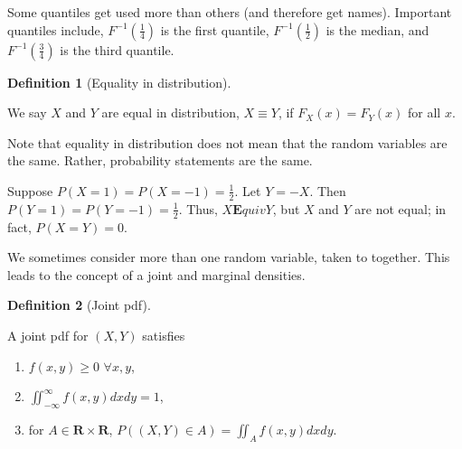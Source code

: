 \documentclass[
  a4paper,
  oneside]{book}
\providecommand{\tightlist}{%
  \setlength{\itemsep}{0pt}\setlength{\parskip}{0pt}}\usepackage{longtable,booktabs,array}
\theoremstyle{definition}
\newtheorem{definition}{Definition}[chapter]
\theoremstyle{definition}
\theoremstyle{definition}
\theoremstyle{plain}
\theoremstyle{remark}
\begin{document}
Some quantiles get used more than others (and therefore get names).
Important quantiles include, \(F^{-1}(\frac{1}{4})\) is the first
quantile, \(F^{-1}(\frac{1}{2})\) is the median, and
\(F^{-1}(\frac{3}{4})\) is the third quantile.

\begin{definition}[Equality in
distribution]\protect\hypertarget{def-equal-dist}{}\label{def-equal-dist}

We say \(X\) and \(Y\) are equal in distribution, \(X \equiv Y\), if
\(F_X(x) = F_Y(x)\) for all \(x\).

\end{definition}

\begin{tcolorbox}[enhanced jigsaw, colframe=quarto-callout-important-color-frame, breakable, toprule=.15mm, bottomrule=.15mm, title=\textcolor{quarto-callout-important-color}{\faExclamation}\hspace{0.5em}{Important}, arc=.35mm, opacityback=0, left=2mm, opacitybacktitle=0.6, bottomtitle=1mm, toptitle=1mm, titlerule=0mm, rightrule=.15mm, colback=white, colbacktitle=quarto-callout-important-color!10!white, coltitle=black, leftrule=.75mm]

Note that equality in distribution does not mean that the random
variables are the same. Rather, probability statements are the same.

Suppose \(P(X = 1) = P(X = -1) = \frac{1}{2}\). Let \(Y = -X\). Then
\(P(Y = 1) = P(Y = -1) = \frac{1}{2}\). Thus, \(X \mathbf{E}quiv Y\),
but \(X\) and \(Y\) are not equal; in fact, \(P(X = Y) = 0\).

\end{tcolorbox}

We sometimes consider more than one random variable, taken to together.
This leads to the concept of a joint and marginal densities.

\begin{definition}[Joint
pdf]\protect\hypertarget{def-joint-pdf}{}\label{def-joint-pdf}

A joint pdf for \((X,Y)\) satisfies

\begin{enumerate}
\def\labelenumi{\arabic{enumi}.}
\tightlist
\item
  \(f(x,y) \geq 0\) \(\forall x,y\),
\item
  \(\iint_{-\infty}^\infty f(x,y) dx dy = 1\),
\item
  for \(A \in \mathbf{R}\times \mathbf{R}\),
  \(P((X,Y) \in A) = \iint_A f(x,y) dx dy\).
\end{enumerate}

\end{definition}
\end{document}
